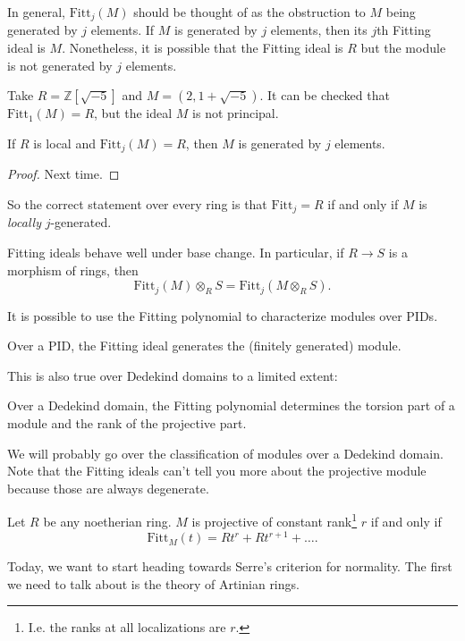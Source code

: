 In general, $\mathrm{Fitt}_j(M)$ should be thought of as the obstruction to $M$
being generated by $j$ elements. If $M$ is generated by $j$ elements, then its
$j$th Fitting ideal is $M$. Nonetheless, it is possible that the Fitting ideal
is $R$ but the module is not generated by $j$ elements.

\begin{example} 
Take $R  = \mathbb{Z}[\sqrt{-5}]$ and $M = (2, 1+\sqrt{-5})$. It can be checked
that $\mathrm{Fitt}_1(M) = R$, but the ideal $M$ is not principal. 
\end{example} 

\begin{proposition} 
If $R$ is local and $\mathrm{Fitt}_j(M) =R$, then $M$ is generated by $j$
elements. 
\end{proposition} 
\begin{proof} 
Next time.
\end{proof} 

So the correct statement over every ring is that $\mathrm{Fitt}_j=R$ if and
only if $M$ is \emph{locally} $j$-generated.

\begin{remark} 
Fitting ideals behave well under base change.  In particular, if $R \to S$ is a
morphism of rings, then
\[ \mathrm{Fitt}_j(M) \otimes_R S = \mathrm{Fitt}_j(M \otimes_R S).   \]
\end{remark} 

It is possible to use the Fitting polynomial to characterize modules over PIDs.

\begin{theorem} 
Over a PID, the Fitting ideal generates the (finitely generated) module.
\end{theorem} 

This is also true over Dedekind domains to a limited extent:

\begin{theorem} 
Over a Dedekind domain, the Fitting polynomial determines the torsion part of a
module and the rank of the projective part.
\end{theorem} 

We will probably go over the classification of modules over a Dedekind domain.
Note that the Fitting ideals can't tell you more about the projective module
because those are always degenerate.

\begin{theorem} Let $R$ be any noetherian ring. 
$M$ is projective of constant rank\footnote{I.e. the ranks at all localizations
are $r$.} $r$ if and only if 
\[ \mathrm{Fitt}_M(t) = Rt^r + Rt^{r+1} + \dots.   \]
\end{theorem} 
Today, we want to start heading towards Serre's criterion for normality. The
first we need to talk about is the theory of Artinian rings.

